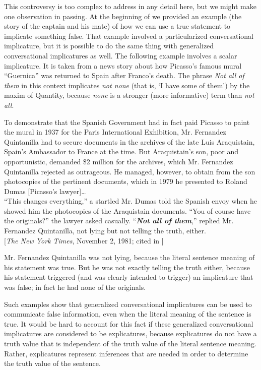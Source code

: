 This controversy is too complex to address in any detail here, but we might make one observation in passing. At the beginning of  we provided an example (the story of the captain and his mate) of how we can use a true statement to implicate something false. That example involved a particularized conversational implicature, but it is possible to do the same thing with generalized conversational implicatures as well. The following example involves a scalar implicature. It is taken from a news story about how Picasso’s famous mural “Guernica” was returned to Spain after Franco’s death. The phrase \textit{Not all of them} in this context implicates \textit{not none} (that is, ‘I have some of them’) by the maxim of Quantity, because \textit{none} is a stronger (more informative) term than \textit{not all}.


\ea \label{ex:9.22}
  To demonstrate that the  {Spanish} Government had in fact paid Picasso to paint the mural in 1937 for the Paris International Exhibition, Mr. Fernandez Quintanilla had to secure documents in the archives of the late Luis Araquistain, Spain’s Ambassador to France at the time. But Araquistain’s son, poor and opportunistic, demanded \$2 million for the archives, which Mr. Fernandez Quintanilla rejected as outrageous. He managed, however, to obtain from the son photocopies of the pertinent documents, which in 1979 he presented to Roland Dumas [Picasso’s lawyer]… \\
  “This changes everything,” a startled Mr. Dumas told the  {Spanish} envoy when he showed him the photocopies of the Araquistain documents. “You of course have the originals?” the lawyer asked casually. “\textbf{\textit{Not all of them}},” replied Mr. Fernandez Quintanilla, not lying but not telling the truth, either.\\
   {}[\textit{The New York Times}, November 2, 1981; cited in \citet{Horn1992}]
\z


Mr. Fernandez Quintanilla was not lying, because the literal sentence meaning of his statement was true. But he was not exactly telling the truth either, because his statement triggered (and was clearly intended to trigger) an implicature that was false; in fact he had none of the originals.



Such examples show that generalized conversational implicatures can be used to communicate false information, even when the literal meaning of the sentence is true. It would be hard to account for this fact if these generalized conversational implicatures are considered to be explicatures, because explicatures do not have a truth value that is independent of the truth value of the literal sentence meaning. Rather, explicatures represent inferences that are needed in order to determine the truth value of the sentence.


